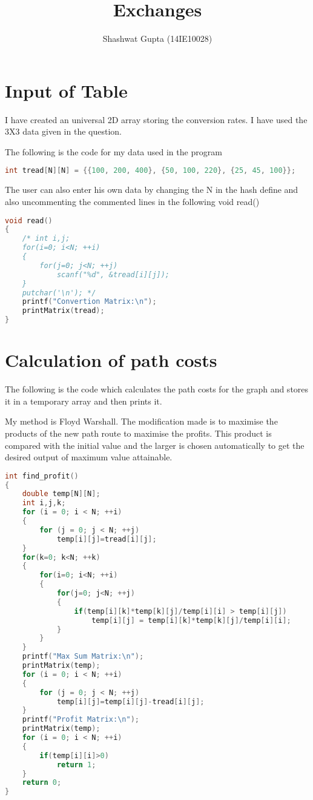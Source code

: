 \documentclass{article}
\title{Exchanges}
\author{Shashwat Gupta (14IE10028)}
\begin{document}
\maketitle

\section{Input of Table}

I have created an universal 2D array storing the conversion rates. I have used the 3X3 data given in the question.

The following is the code for my data used in the program
\begin{lstlisting}[language=c, caption=Input]
int tread[N][N] = {{100, 200, 400}, {50, 100, 220}, {25, 45, 100}};
\end{lstlisting}

The user can also enter his own data by changing the N in the hash define and also uncommenting the commented lines in the following void read()
\begin{lstlisting}[language=c, caption=Input]
void read()
{
    /* int i,j;
    for(i=0; i<N; ++i)
    {
        for(j=0; j<N; ++j)
            scanf("%d", &tread[i][j]);
    }
    putchar('\n'); */
    printf("Convertion Matrix:\n");
    printMatrix(tread);
}
\end{lstlisting}

\section{Calculation of path costs}

The following is the code which calculates the path costs for the graph and stores it in a temporary array and then prints it.

My method is Floyd Warshall.
The modification made is to maximise the products of the new path route to maximise the profits. This product is compared with the initial value and the larger is chosen automatically to get the desired output of maximum value attainable.

\begin{lstlisting}[language=c, caption=read]
int find_profit()
{
    double temp[N][N];
    int i,j,k;
    for (i = 0; i < N; ++i)
    {
        for (j = 0; j < N; ++j)
            temp[i][j]=tread[i][j];
    }
    for(k=0; k<N; ++k)
    {
        for(i=0; i<N; ++i)
        {
            for(j=0; j<N; ++j)
            {
                if(temp[i][k]*temp[k][j]/temp[i][i] > temp[i][j])
                    temp[i][j] = temp[i][k]*temp[k][j]/temp[i][i];
            }
        }
    }
    printf("Max Sum Matrix:\n");
    printMatrix(temp);
    for (i = 0; i < N; ++i)
    {
        for (j = 0; j < N; ++j)
            temp[i][j]=temp[i][j]-tread[i][j];
    }
    printf("Profit Matrix:\n");
    printMatrix(temp);
    for (i = 0; i < N; ++i)
    {
        if(temp[i][i]>0)
            return 1;
    }
    return 0;
}
\end{lstlisting}
\end{document}
